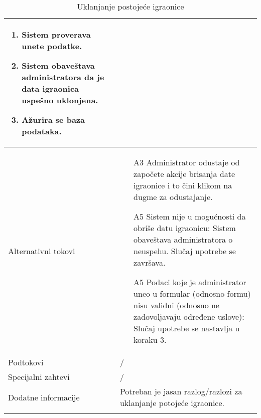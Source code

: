 \documentclass[../main.tex]{subfiles}
\begin{document}
\begin{longtable}{| p{} | p{} |}
\begin{enumerate}
        \item Sistem proverava unete podatke. %
        \item Sistem obaveštava administratora da je data igraonica uspešno uklonjena.
        \item Ažurira se baza podataka. %
    \end{enumerate}\\
\hline
    Alternativni tokovi & \begin{itemize}
        \item[A3] Administrator odustaje od započete akcije brisanja date igraonice i to čini klikom na dugme za odustajanje.
        \item[A5]  Sistem nije u mogućnosti da obriše datu igraonicu: Sistem obaveštava administratora o neuspehu. Slučaj upotrebe se završava.
        \item[A5]  Podaci koje je administrator uneo u formular (odnosno formu) nisu validni (odnosno ne zadovoljavaju određene uslove): Slučaj upotrebe se nastavlja u koraku 3. %
    \end{itemize}\\
\hline
    Podtokovi & /\\
\hline
    Specijalni zahtevi & /\\
\hline
    Dodatne informacije & Potreban je jasan razlog/razlozi za uklanjanje potojeće igraonice.
    \\
\hline
\caption{Uklanjanje postojeće igraonice} %
\end{longtable}
\end{document}
